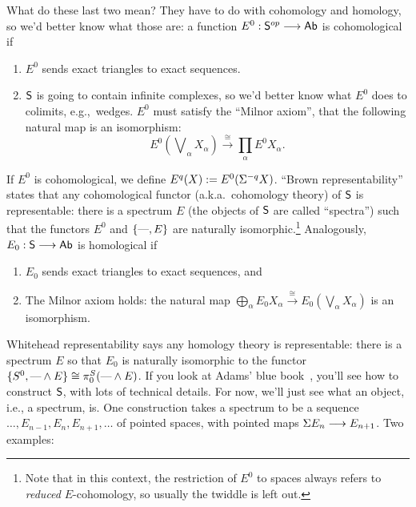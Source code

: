 What do these last two mean?  They have to do with cohomology and homology, so we'd better know what those are: a function $E^0: \mathsf{S}^{op} \longrightarrow \mathsf{Ab}$ is cohomological if
\begin{enumerate}
\item $E^0$ sends exact triangles to exact sequences.
\item $\mathsf{S}$ is going to contain infinite complexes, so we'd better know what $E^0$ does to colimits, e.g.,\ wedges. $E^0$ must satisfy the ``Milnor axiom'', that the following natural map is an isomorphism:
\[
E^0({\textstyle{\!\bigvee}_\alpha X_\alpha}) \stackrel{\cong}{\to} \prod_\alpha E^0 X_\alpha
.\]
\end{enumerate}
If $E^0$ is cohomological, we define $E^q (X) := E^0 (\Sigma^{-q} X)$. ``Brown representability'' states that any cohomological functor (a.k.a.\ cohomology theory) of $\mathsf{S}$ is representable: there is a spectrum $E$ (the objects of $\mathsf{S}$ are called ``spectra'') such that the functors $E^0$ and $\{\textup{---}, E\}$ are naturally isomorphic.\footnote{Note that in this context, the restriction of $E^0$ to spaces always refers to \emph{reduced} $E$-cohomology, so usually the twiddle is left out.}  Analogously, $E_0: \mathsf{S} \longrightarrow \mathsf{Ab}$ is homological if
\begin{enumerate}
\item $E_0$ sends exact triangles to exact sequences, and
\item The Milnor axiom holds: the natural map $\bigoplus_\alpha E_0 X_\alpha \stackrel{\cong}{\to} E_0(\bigvee_\alpha X_\alpha)$ is an isomorphism.
\end{enumerate}
Whitehead representability says any homology theory is representable: there is a spectrum $E$ so that $E_0$ is naturally isomorphic to the functor $\{S^0, \text{---} \wedge E\} \cong \pi^S_0(\text{---} \wedge E)$.  If you look at Adams' blue book~\cite{Adams}, you'll see how to construct $\mathsf{S}$, with lots of technical details.  For now, we'll just see what an object, i.e., a spectrum, is.  One construction takes a spectrum to be a sequence $\ldots, E_{n-1}, E_n, E_{n+1}, \ldots$ of pointed spaces, with pointed maps $\Sigma E_n \longrightarrow E_{n+1}$.  Two examples:
